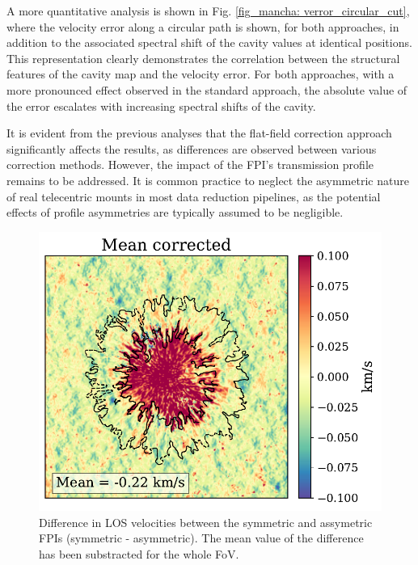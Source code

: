 A more quantitative analysis is shown in Fig. \ref{fig_mancha: verror_circular_cut}, where the velocity error along a circular path is shown, for both approaches, in addition to the associated spectral shift of the cavity values at identical positions. This representation clearly demonstrates the correlation between the structural features of the cavity map and the velocity error. For both approaches, with a more pronounced effect observed in the standard approach, the absolute value of the error escalates with increasing spectral shifts of the cavity.

It is evident from the previous analyses that the flat-field correction approach significantly affects the results, as differences are observed between various correction methods. However, the impact of the FPI's transmission profile remains to be addressed. It is common practice to neglect the asymmetric nature of real telecentric mounts in most data reduction pipelines, as the potential effects of profile asymmetries are typically assumed to be negligible.

\begin{figure}
  \begin{minipage}[c]{0.5\textwidth}
    \includegraphics[width=\textwidth]{figures/Mancha/vlos_sym_vs_asym.pdf}
  \end{minipage}\hfill\hfill
  \begin{minipage}[c]{0.47\textwidth}
    \caption{
      Difference in LOS velocities between the symmetric and assymetric FPIs (symmetric - asymmetric). The mean value of the difference has been substracted for the whole FoV. \label{fig_mancha: vlos_asym_vs_sym}} 
  \end{minipage}
\end{figure}

